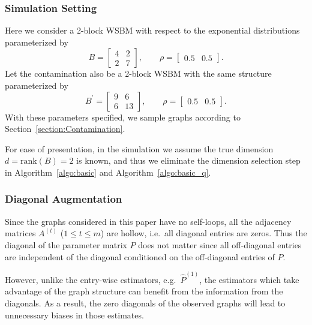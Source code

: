 \documentclass[a4paper]{article}
\renewcommand{\hat}{\widehat}
\begin{document}
\subsubsection{Simulation Setting}
\label{section:sim_setting}
Here we consider a 2-block WSBM with respect to the exponential distributions parameterized by
\begin{equation*}
B = \begin{bmatrix}
4 & 2 \\
2 & 7
\end{bmatrix}
,\qquad \rho = \begin{bmatrix}
0.5 & 0.5
\end{bmatrix}.
\end{equation*}
Let the contamination also be a 2-block WSBM with the same structure parameterized by
\begin{equation*}
B^{\prime} = \begin{bmatrix}
9 & 6 \\
6 & 13
\end{bmatrix}
,\qquad \rho = \begin{bmatrix}
0.5 & 0.5
\end{bmatrix}.
\end{equation*}
With these parameters specified, we sample graphs according to Section~\ref{section:Contamination}.

For ease of presentation, in the simulation we assume the true dimension $d = \mathrm{rank}(B) = 2$ is known, and thus we eliminate the dimension selection step in Algorithm~\ref{algo:basic} and Algorithm~\ref{algo:basic_q}.


\subsubsection{Diagonal Augmentation}
\label{section:diag_aug}

Since the graphs considered in this paper have no self-loops, all the adjacency matrices $A^{(t)}$ ($1 \le t \le m$) are hollow, i.e.\ all diagonal entries are zeros. Thus the diagonal of the parameter matrix $P$ does not matter since all off-diagonal entries are independent of the diagonal conditioned on the off-diagonal entries of $P$.

However, unlike the entry-wise estimators, e.g.\ $\hat{P}^{(1)}$, the estimators which take advantage of the graph structure can benefit from the information from the diagonals. As a result, the zero diagonals of the observed graphs will lead to unnecessary biases in those estimates.
\end{document}
